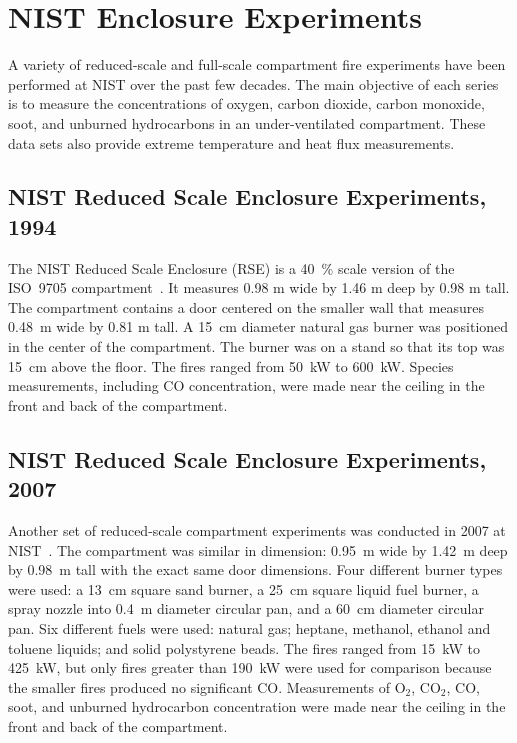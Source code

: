 \section{NIST Enclosure Experiments}

A variety of reduced-scale and full-scale compartment fire experiments have been performed at NIST over the past few decades. The main objective of each series is to measure the concentrations of oxygen, carbon dioxide, carbon monoxide, soot, and unburned hydrocarbons in an under-ventilated compartment. These data sets also provide extreme temperature and heat flux measurements.

\subsection{NIST Reduced Scale Enclosure Experiments, 1994}

The NIST Reduced Scale Enclosure (RSE) is a 40~\% scale version of the ISO~9705 compartment~\cite{Bryner:1}. It measures 0.98 m wide by 1.46 m deep by 0.98 m tall.  The compartment contains a door centered on the smaller wall that measures 0.48~m wide by 0.81 m tall.  A 15~cm diameter natural gas burner was positioned in the center of the compartment.  The burner was on a stand so that its top was 15~cm above the floor. The fires ranged from 50~kW to 600~kW. Species measurements, including CO concentration, were made near the ceiling in the front and back of the compartment.

\subsection{NIST Reduced Scale Enclosure Experiments, 2007}

Another set of reduced-scale compartment experiments was conducted in 2007 at NIST~\cite{Bundy:1}. The compartment was similar in dimension: 0.95~m wide by 1.42~m deep by 0.98~m tall with the exact same door dimensions. Four different burner types were used: a 13~cm square sand burner, a 25~cm square liquid fuel burner, a spray nozzle into 0.4~m diameter circular pan, and a 60~cm diameter circular pan. Six different fuels were used: natural gas; heptane, methanol, ethanol and toluene liquids; and solid polystyrene beads. The fires ranged from 15~kW to 425~kW, but only fires greater than 190~kW were used for comparison because the smaller fires produced no significant CO. Measurements of O$_2$, CO$_2$, CO, soot, and unburned hydrocarbon concentration were made near the ceiling in the front and back of the compartment.

